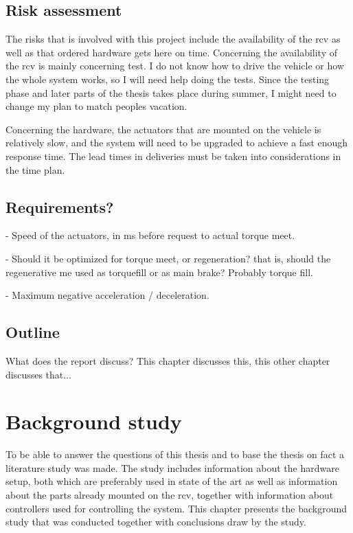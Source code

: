 \documentclass[a4paper,11pt]{kth-mag}
\begin{document}
\section{Risk assessment}
The risks that is involved with this project include the availability of the \gls{rcv} as well as that ordered hardware gets here on time. Concerning the availability of the \gls{rcv} is mainly concerning test. I do not know how to drive the vehicle or how the whole system works, so I will need help doing the tests. Since the testing phase and later parts of the thesis takes place during summer, I might need to change my plan to match peoples vacation. \newline

Concerning the hardware, the actuators that are mounted on the vehicle is relatively slow, and the system will need to be upgraded to achieve a fast enough response time. The lead times in deliveries must be taken into considerations in the time plan.


\section{Requirements?}

- Speed of the actuators, in ms before request to actual torque meet.

- Should it be optimized for torque meet, or regeneration? that is, should the regenerative me used as torquefill or as main brake? Probably torque fill.

- Maximum negative acceleration / deceleration.

\section{Outline}
What does the report discuss?
This chapter discusses this, this other chapter discusses that...



\chapter{Background study}
To be able to answer the questions of this thesis and to base the thesis on fact a literature study was made. The study includes information about the hardware setup, both which are preferably used in state of the art as well as information about the parts already mounted on the \gls{rcv}, together with information about controllers used for controlling the system. This chapter presents the background study that was conducted together with conclusions draw by the study.
\end{document}
